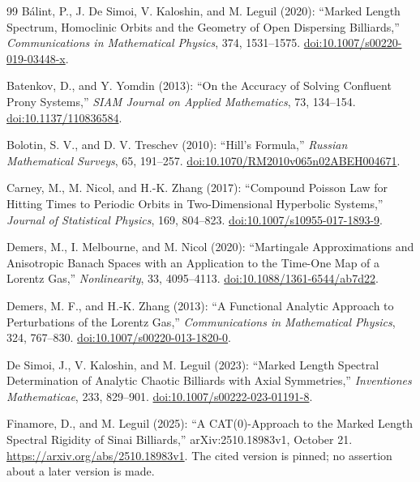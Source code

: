 \begin{thebibliography}{99}
B\'alint, P., J. De Simoi, V. Kaloshin, and M. Leguil (2020): ``Marked Length Spectrum, Homoclinic Orbits and the Geometry of Open Dispersing Billiards,'' \emph{Communications in Mathematical Physics}, 374, 1531--1575. \href{https://doi.org/10.1007/s00220-019-03448-x}{doi:10.1007/s00220-019-03448-x}.

Batenkov, D., and Y. Yomdin (2013): ``On the Accuracy of Solving Confluent Prony Systems,'' \emph{SIAM Journal on Applied Mathematics}, 73, 134--154. \href{https://doi.org/10.1137/110836584}{doi:10.1137/110836584}.

Bolotin, S. V., and D. V. Treschev (2010): ``Hill's Formula,'' \emph{Russian Mathematical Surveys}, 65, 191--257. \href{https://doi.org/10.1070/RM2010v065n02ABEH004671}{doi:10.1070/RM2010v065n02ABEH004671}.

Carney, M., M. Nicol, and H.-K. Zhang (2017): ``Compound Poisson Law for Hitting Times to Periodic Orbits in Two-Dimensional Hyperbolic Systems,'' \emph{Journal of Statistical Physics}, 169, 804--823. \href{https://doi.org/10.1007/s10955-017-1893-9}{doi:10.1007/s10955-017-1893-9}.

Demers, M., I. Melbourne, and M. Nicol (2020): ``Martingale Approximations and Anisotropic Banach Spaces with an Application to the Time-One Map of a Lorentz Gas,'' \emph{Nonlinearity}, 33, 4095--4113. \href{https://doi.org/10.1088/1361-6544/ab7d22}{doi:10.1088/1361-6544/ab7d22}.

Demers, M. F., and H.-K. Zhang (2013): ``A Functional Analytic Approach to Perturbations of the Lorentz Gas,'' \emph{Communications in Mathematical Physics}, 324, 767--830. \href{https://doi.org/10.1007/s00220-013-1820-0}{doi:10.1007/s00220-013-1820-0}.

De Simoi, J., V. Kaloshin, and M. Leguil (2023): ``Marked Length Spectral Determination of Analytic Chaotic Billiards with Axial Symmetries,'' \emph{Inventiones Mathematicae}, 233, 829--901. \href{https://doi.org/10.1007/s00222-023-01191-8}{doi:10.1007/s00222-023-01191-8}.

Finamore, D., and M. Leguil (2025): ``A CAT(0)-Approach to the Marked Length Spectral Rigidity of Sinai Billiards,'' arXiv:2510.18983v1, October 21. \url{https://arxiv.org/abs/2510.18983v1}. The cited version is pinned; no assertion about a later version is made.


\end{thebibliography}

